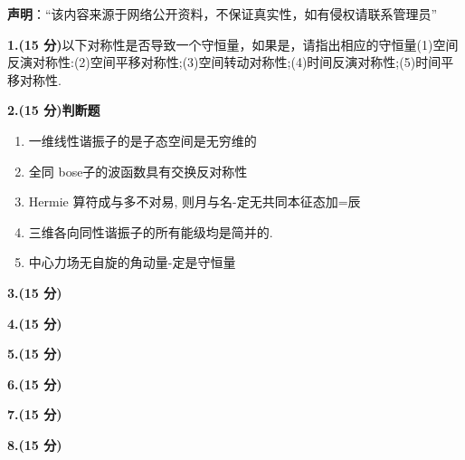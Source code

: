 
\textbf{声明}：“该内容来源于网络公开资料，不保证真实性，如有侵权请联系管理员”

\textbf{1.(15 分)}以下对称性是否导致一个守恒量，如果是，请指出相应的守恒量(1)空间反演对称性:(2)空间平移对称性;(3)空间转动对称性;(4)时间反演对称性;(5)时间平移对称性.

\textbf{2.(15 分)判断题}
\begin{enumerate}
\item 一维线性谐振子的是子态空间是无穷维的
\item 全同 bose子的波函数具有交换反对称性
\item Hermie 算符成与多不对易, 则月与名-定无共同本征态加=辰
\item 三维各向同性谐振子的所有能级均是简并的.
\item 中心力场无自旋的角动量-定是守恒量
\end{enumerate}


\textbf{3.(15 分)}


\textbf{4.(15 分)}

\textbf{5.(15 分)}

\textbf{6.(15 分)}

\textbf{7.(15 分)}

\textbf{8.(15 分)}